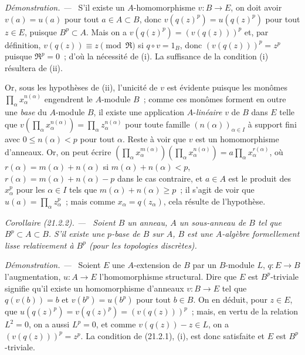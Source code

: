 \documentclass[10pt,oneside]{book}
\makeatletter
\newcommand{\setmanualcurrentlabel}[1]{\def\@currentlabel{#1}}
\newcommand{\oldpage}[2][]{%
  \setcounter{footnote}{0}%
  \marginpar{\scriptsize\textbf{#1}~|~#2}\ignorespaces}
\newenvironment{corollary}[1][]{%
  \setmanualcurrentlabel{#1}\par\medskip\noindent\itshape Corollaire (#1). ---\ }{\par}
\newenvironment{proof}{%
  \par\medskip\noindent\textit{Démonstration. ---\ }}{\par}
\makeatother
\begin{document}
\begin{proof}
S'il existe un $A$-homomorphisme $v:B\to E$, on doit avoir $v(a)=u(a)$ pour
tout $a\in A\subset B$, donc $v(q(z)^p)=u(q(z)^p)$ pour tout $z\in E$,
puisque $B^p\subset A$. Mais on a $v(q(z)^p)=(v(q(z)))^p$ et, par définition,
$v(q(z))\equiv z\pmod{\mathfrak R}$ si $q\circ v=1_B$, donc
$(v(q(z)))^p=z^p$ puisque $\mathfrak R^p=0$~; d'où la nécessité de (i).
La suffisance de la condition (i) résultera de (ii).

Or, sous les hypothèses de (ii), l'unicité de $v$ est évidente puisque les
monômes $\prod_\alpha x_\alpha^{n(\alpha)}$ engendrent le $A$-module $B$~;
comme ces monômes forment en outre une \emph{base} du $A$-module $B$, il existe
une application $A$-\emph{linéaire} $v$ de $B$ dans $E$ telle que
$v(\prod_\alpha x_\alpha^{n(\alpha)})=\prod_\alpha z_\alpha^{n(\alpha)}$
pour toute famille $(n(\alpha))_{\alpha\in I}$ à support fini avec
$0\leq n(\alpha)<p$ pour tout $\alpha$. Reste à voir que $v$ est un
homomorphisme d'anneaux. Or, on peut écrire
$(\prod_\alpha x_\alpha^{m(\alpha)})(\prod_\alpha x_\alpha^{n(\alpha)})
=a\prod_\alpha x_\alpha^{r(\alpha)}$, où
$r(\alpha)=m(\alpha)+n(\alpha)$ si $m(\alpha)+n(\alpha)<p$,
$r(\alpha)=m(\alpha)+n(\alpha)-p$ dans le cas contraire, et $a\in A$
\oldpage[0\textsubscript{IV-1}]{158}
est le produit des $x_\alpha^p$ pour les $\alpha\in I$ tels que
$m(\alpha)+n(\alpha)\geq p$~; il s'agit de voir que
$u(a)=\prod_\alpha z_\alpha^p$~; mais comme $x_\alpha=q(z_\alpha)$, cela
résulte de l'hypothèse.
\end{proof}

\begin{corollary}[21.2.2]
\label{0.21.2.2-fr}
Soient $B$ un anneau, $A$ un sous-anneau de $B$ tel que $B^p\subset A\subset B$.
S'il existe une $p$-base de $B$ sur $A$, $B$ est une $A$-algèbre formellement
lisse relativement à $B^p$ (pour les topologies discrètes).
\end{corollary}

\begin{proof}
Soient $E$ une $A$-extension de $B$ par un $B$-module $L$, $q:E\to B$
l'augmentation, $u:A\to E$ l'homomorphisme structural. Dire que $E$ est
$B^p$-triviale signifie qu'il existe un homomorphisme d'anneaux $v:B\to E$
tel que $q(v(b))=b$ et $v(b^p)=u(b^p)$ pour tout $b\in B$. On en déduit,
pour $z\in E$, que $u(q(z)^p)=v(q(z)^p)=(v(q(z)))^p$~; mais, en vertu de
la relation $L^2=0$, on a aussi $L^p=0$, et comme $v(q(z))-z\in L$, on a
$(v(q(z)))^p=z^p$. La condition de (21.2.1), (i), est donc satisfaite et
$E$ est $B^p$-triviale.
\end{proof}
\end{document}
